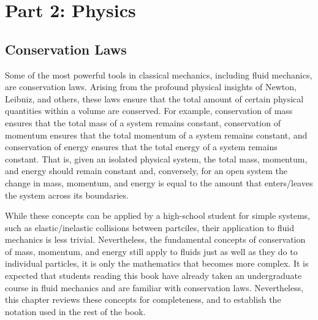 \part{Part 2: Physics}


\chapter{Conservation Laws}
Some of the most powerful tools in classical mechanics, including fluid mechanics, are conservation laws. Arising from the profound physical insights of Newton, Leibniz, and others, these laws ensure that the total amount of certain physical quantities within a volume are conserved. For example, conservation of mass ensures that the total mass of a system remains constant, conservation of momentum ensures that the total momentum of a system remains constant, and conservation of energy ensures that the total energy of a system remains constant. That is, given an isolated physical system, the total mass, momentum, and energy should remain constant and, conversely, for an open system the change in mass, momentum, and energy is equal to the amount that enters/leaves the system across its boundaries.

While these concepts can be applied by a high-school student for simple systems, such as elastic/inelastic collisions between partciles, their application to fluid mechanics is less trivial. Nevertheless, the fundamental concepts of conservation of mass, momentum, and energy still apply to fluids just as well as they do to individual particles, it is only the mathematics that becomes more complex. It is expected that students reading this book have already taken an undergraduate course in fluid mechanics and are familiar with conservation laws. Nevertheless, this chapter reviews these concepts for completeness, and to establish the notation used in the rest of the book.

